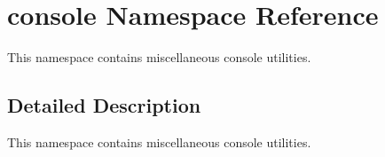 \hypertarget{namespaceconsole}{}\section{console Namespace Reference}
\label{namespaceconsole}


This namespace contains miscellaneous console utilities.  




\subsection{Detailed Description}
This namespace contains miscellaneous console utilities. 
